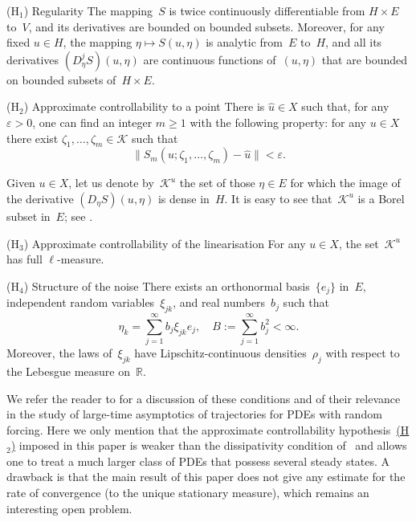 \documentclass[11pt]{article}
\theoremstyle{plain}
\theoremstyle{definition}
\newtheorem*{namedassumption}{\jepassumptionname}
\newenvironment{enonce*}[1]{\def\jepassumptionname{#1}\begin{namedassumption}}{\end{namedassumption}}
\let\mathcal\mathscr
\theoremstyle{plain}
\numberwithin{equation}{section}
\let\e\varepsilon
\newcommand{\R}{{\mathbb R}}
\newcommand{\KK}{{\mathcal K}}
\begin{document}
\begin{enonce*}{\hypertarget{H1}{(H$_1$)} Regularity}
The mapping~$S$ is twice continuously differentiable from $H\times E$ to~$V$, and its derivatives are bounded on bounded subsets. Moreover, for any fixed $u\in H$, the mapping $\eta\mapsto S(u,\eta)$ is analytic from~$E$ to~$H$, and all its derivatives $(D_\eta^jS)(u,\eta)$ are continuous functions of~$(u,\eta)$ that are bounded on bounded subsets of~$H\times E$.
\end{enonce*}

\begin{enonce*}{\hypertarget{H2}{(H$_2$)} Approximate controllability to a point}
There is $\hat u\in X$ such that, for any $\e>0$, one can find an integer $m\ge1$ with the following property: for any $u\in X$ there exist $\zeta_1,\dots,\zeta_m\in\KK$ such that
\begin{equation} \label{1.2}
\|S_m(u;\zeta_1,\dots,\zeta_m)-\hat u\|<\e.
\end{equation}
\end{enonce*}

Given $u\in X$, let us denote by~$\KK^u$ the set of those $\eta\in E$ for which the image of the derivative $(D_\eta S)(u,\eta)$ is dense in~$H$. It is easy to see that~$\KK^u$ is a Borel subset in~$E$; see \cite[\S1.1]{KNS-2020}.

\begin{enonce*}{\hypertarget{H3}{(H$_3$)} Approximate controllability of the linearisation}
For any $u\in X$, the set~$\KK^u$ has full $\ell$-measure.
\end{enonce*}

\begin{enonce*}{\hypertarget{H4}{(H$_4$)} Structure of the noise}
There exists an orthonormal basis~$\{e_j\}$ in~$E$, independent random variables~$\xi_{jk}$, and real numbers~$b_j$ such that
\begin{equation} \label{1.3}
\eta_k=\sum_{j=1}^\infty b_j\xi_{jk}e_j,\quad B:=\sum_{j=1}^\infty b_j^2<\infty.
\end{equation}
Moreover, the laws of~$\xi_{jk}$ have Lipschitz-continuous densities~$\rho_j$ with respect to the Lebesgue measure on~$\R$.
\end{enonce*}

We refer the reader to \cite[\S1.1]{KNS-2020} for a discussion of these conditions and of their relevance in the study of large-time asymptotics of trajectories for PDEs with random forcing. Here we only mention that the approximate controllability hypothesis~\hyperlink{H2}{(H$_2$)} imposed in this paper is weaker than the dissipativity condition of~\cite{KNS-2020} and allows one to treat a much larger class of PDEs that possess several steady states. A drawback is that the main result of this paper does not give any estimate for the rate of convergence (to the unique stationary measure), which remains an interesting open problem.
\end{document}
